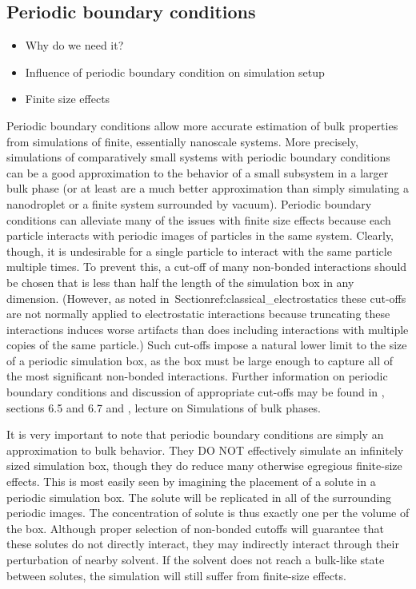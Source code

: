 \documentclass[9pt,bestpractices]{livecoms}
\begin{document}
\subsection{Periodic boundary conditions}
\begin{itemize}
\item Why do we need it?
\item Influence of periodic boundary condition on simulation setup
\item Finite size effects
\end{itemize}


Periodic boundary conditions allow more accurate estimation of bulk properties from simulations of finite, essentially nanoscale systems. 
More precisely, simulations of comparatively small systems with periodic boundary conditions can be a good approximation to the   behavior of a small subsystem in a larger bulk phase (or at least are a much better approximation than simply simulating a nanodroplet or a finite system surrounded by vacuum). 
Periodic boundary conditions can alleviate many of the issues with finite size effects because each particle interacts with periodic images of particles in the same system. 
Clearly, though, it is undesirable for a single particle to interact with the same particle multiple times. 
To prevent this, a cut-off of many non-bonded interactions should be chosen that is less than half the length of the simulation box in any dimension.
(However, as noted in~Section{ref:classical_electrostatics} these cut-offs are not normally applied to electrostatic interactions because truncating these interactions induces worse artifacts than does including interactions with multiple copies of the same particle.)
Such cut-offs impose a natural lower limit to the size of a periodic simulation box, as the box must be large enough to capture all of the most significant non-bonded interactions. 
Further information on periodic boundary conditions and discussion of appropriate cut-offs may be found in \citet{LeachBook}, sections 6.5 and 6.7 and \citet{ShellNotes}, lecture on Simulations of bulk phases.

It is very important to note that periodic boundary conditions are simply an approximation to bulk behavior. 
They DO NOT effectively simulate an infinitely sized simulation box, though they do reduce many otherwise egregious finite-size effects.
This is most easily seen by imagining the placement of a solute in a periodic simulation box. 
The solute will be replicated in all of the surrounding periodic images. 
The concentration of solute is thus exactly one per the volume of the box. 
Although proper selection of non-bonded cutoffs will guarantee that these solutes do not directly interact, they may indirectly interact through their perturbation of nearby solvent. 
If the solvent does not reach a bulk-like state between solutes, the simulation will still suffer from finite-size effects. 
\end{document}
